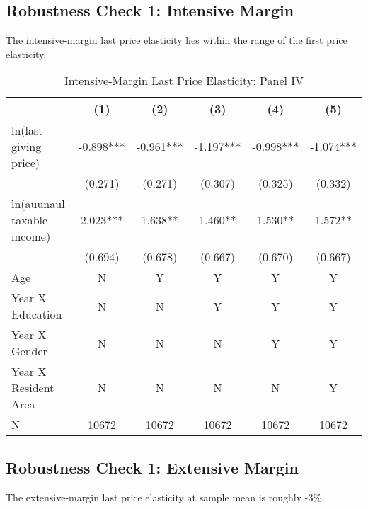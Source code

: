 \documentclass[ review  , 3p ]{elsarticle}
\begin{document}
  \hypertarget{robustness-check-1-intensive-margin}{%
  \subsection{Robustness Check 1: Intensive Margin}\label{robustness-check-1-intensive-margin}}
  
  The intensive-margin last price elasticity lies within the range of the first price elasticity.
  
  \begin{table}
  
  \caption{\label{tab:kableLastElasticity2Slide1}Intensive-Margin Last Price Elasticity: Panel IV}
  \centering
  \fontsize{7}{9}\selectfont
  \begin{tabular}[t]{lccccc}
  \toprule
   & (1) & (2) & (3) & (4) & (5)\\
  \midrule
  ln(last giving price) & -0.898*** & -0.961*** & -1.197*** & -0.998*** & -1.074***\\
   & (0.271) & (0.271) & (0.307) & (0.325) & (0.332)\\
  ln(auunaul taxable income) & 2.023*** & 1.638** & 1.460** & 1.530** & 1.572**\\
   & (0.694) & (0.678) & (0.667) & (0.670) & (0.667)\\
  Age & N & Y & Y & Y & Y\\
  Year X Education & N & N & Y & Y & Y\\
  Year X Gender & N & N & N & Y & Y\\
  Year X Resident Area & N & N & N & N & Y\\
  N & 10672 & 10672 & 10672 & 10672 & 10672\\
  \bottomrule
  \end{tabular}
  \end{table}
  
  \hypertarget{robustness-check-1-extensive-margin}{%
  \subsection{Robustness Check 1: Extensive Margin}\label{robustness-check-1-extensive-margin}}
  
  The extensive-margin last price elasticity at sample mean is roughly -3\%.
  
\end{document}
